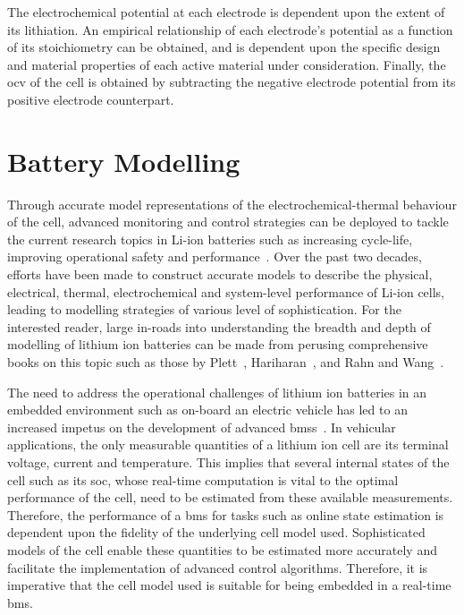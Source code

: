 The electrochemical potential at each electrode  is dependent upon the extent of
its  lithiation. An  empirical  relationship of  each  electrode's potential  as
a  function  of  its  stoichiometry  can be  obtained,  and  is  dependent  upon
the  specific design  and  material  properties of  each  active material  under
consideration. Finally, the \gls{ocv} of the cell is obtained by subtracting the
negative electrode potential from its positive electrode counterpart.


\section{Battery Modelling}

Through accurate model representations  of the electrochemical-thermal behaviour
of  the cell,  advanced monitoring  and control  strategies can  be deployed  to
tackle  the current  research  topics  in Li-ion  batteries  such as  increasing
cycle-life, improving operational  safety and performance~\cite{Plett2015}. Over
the past  two decades, efforts  have been made  to construct accurate  models to
describe  the physical,  electrical, thermal,  electrochemical and  system-level
performance  of  Li-ion  cells,  leading  to  modelling  strategies  of  various
level  of  sophistication.  For  the  interested  reader,  large  in-roads  into
understanding  the breadth  and  depth  of modelling  of  lithium ion  batteries
can  be  made   from  perusing  comprehensive  books  on  this   topic  such  as
those  by Plett~\cite{Plett2015},  Hariharan~\cite{Hariharan2017}, and  Rahn and
Wang~\cite{Rahn2013}.

The  need  to  address  the  operational challenges  of  lithium  ion  batteries
in   an   embedded   environment   such  as   on-board   an   electric   vehicle
has   led   to  an   increased   impetus   on   the  development   of   advanced
\glspl{bms}~\cite{Bergveld2002}. In vehicular  applications, the only measurable
quantities  of  a  lithium  ion  cell are  its  terminal  voltage,  current  and
temperature. This implies  that several internal states of the  cell such as its
\gls{soc}, whose  real-time computation is  vital to the optimal  performance of
the cell, need to be estimated from these available measurements. Therefore, the
performance  of  a \gls{bms}  for  tasks  such  as  online state  estimation  is
dependent upon  the fidelity  of the underlying  cell model  used. Sophisticated
models of the  cell enable these quantities to be  estimated more accurately and
facilitate the implementation  of advanced control algorithms.  Therefore, it is
imperative  that  the cell  model  used  is suitable  for  being  embedded in  a
real-time \gls{bms}.

